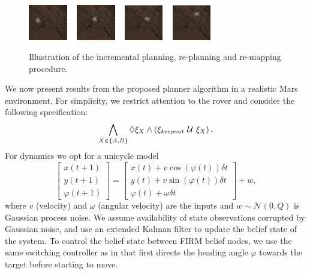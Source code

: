 \documentclass[letterpaper]{article} %
\begin{document}
\begin{figure}[t!]
{		\includegraphics[width=0.15\textwidth]{figs/pdf4.png} ~ \includegraphics[width=0.15\textwidth]{figs/pdf5.png} ~ \includegraphics[width=0.15\textwidth]{figs/pdf6.png} ~ \includegraphics[width=0.15\textwidth]{figs/pdf7.png} 
	}
	\caption{Illustration of the incremental planning, re-planning and re-mapping procedure.}
	\label{fig:simulation}
\end{figure}

We now present results from the proposed planner algorithm in a realistic Mars environment. For simplicity, we restrict attention to the rover and consider the following specification:
\begin{equation}
    \bigwedge_{X \in \{A,B \}} \lozenge \xi_X \land \left( \xi_{keepout} \ \mathcal{U}\  \xi_X \right).
\end{equation}
For dynamics we opt for a unicycle model
\begin{equation}
    \begin{bmatrix}
        x(t+1) \\
        y(t+1) \\
        \varphi(t+1)
    \end{bmatrix} = \begin{bmatrix}x(t) + v \cos(\varphi(t)) \delta{t}\\ y(t) + v \sin(\varphi(t)) \delta{t}\\ \varphi(t) + \omega \delta{t} \end{bmatrix} + w,
\end{equation}
where $v$ (velocity) and $\omega$ (angular velocity) are the inputs and $w \sim \mathcal N(0, Q)$ is Gaussian process noise. We assume availability of state observations corrupted by Gaussian noise, and use an extended Kalman filter to update the belief state of the system. To control the belief state between FIRM belief nodes, we use the same switching controller as in \cite{Cristi-CDC-2016} that first directs the heading angle $\varphi$ towards the target before starting to move. 
\end{document}
